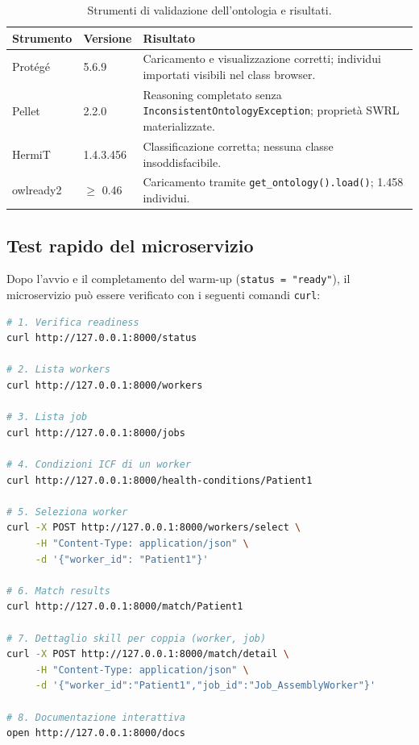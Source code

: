 \documentclass[a4paper,12pt]{article}
\begin{document}
\begin{table}[H]
\centering
\caption{Strumenti di validazione dell'ontologia e risultati.}
\begin{tabular}{L{4cm} L{3cm} L{5.5cm}}
\toprule
\textbf{Strumento} & \textbf{Versione} & \textbf{Risultato} \\
\midrule
Prot\'{e}g\'{e} & 5.6.9 &
  Caricamento e visualizzazione corretti; individui importati
  visibili nel class browser. \\[3pt]
Pellet & 2.2.0 &
  Reasoning completato senza \texttt{InconsistentOntologyException};
  propriet\`{a} SWRL materializzate. \\[3pt]
HermiT & 1.4.3.456 &
  Classificazione corretta; nessuna classe insoddisfacibile. \\[3pt]
owlready2 & $\geq$ 0.46 &
  Caricamento tramite \texttt{get\_ontology().load()}; 1.458 individui. \\
\bottomrule
\end{tabular}
\end{table}

\subsection{Test rapido del microservizio}

Dopo l'avvio e il completamento del warm-up (\texttt{status = "ready"}),
il microservizio pu\`{o} essere verificato con i seguenti comandi
\texttt{curl}:

\begin{lstlisting}[language=bash, caption={Test rapido degli endpoint principali.}]
# 1. Verifica readiness
curl http://127.0.0.1:8000/status

# 2. Lista workers
curl http://127.0.0.1:8000/workers

# 3. Lista job
curl http://127.0.0.1:8000/jobs

# 4. Condizioni ICF di un worker
curl http://127.0.0.1:8000/health-conditions/Patient1

# 5. Seleziona worker
curl -X POST http://127.0.0.1:8000/workers/select \
     -H "Content-Type: application/json" \
     -d '{"worker_id": "Patient1"}'

# 6. Match results
curl http://127.0.0.1:8000/match/Patient1

# 7. Dettaglio skill per coppia (worker, job)
curl -X POST http://127.0.0.1:8000/match/detail \
     -H "Content-Type: application/json" \
     -d '{"worker_id":"Patient1","job_id":"Job_AssemblyWorker"}'

# 8. Documentazione interattiva
open http://127.0.0.1:8000/docs
\end{lstlisting}
\end{document}

